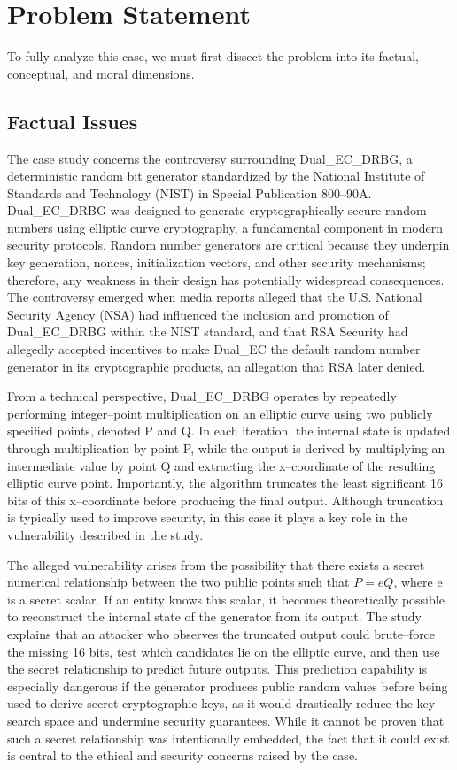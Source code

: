 \documentclass[12pt,letterpaper]{article}
\begin{document}
\section{Problem Statement}
To fully analyze this case, we must first dissect the problem into its factual, conceptual, and moral dimensions.

\subsection{Factual Issues}
The case study concerns the controversy surrounding Dual\_EC\_DRBG, a deterministic random bit generator standardized by the National Institute of Standards and Technology (NIST) in Special Publication 800--90A. Dual\_EC\_DRBG was designed to generate cryptographically secure random numbers using elliptic curve cryptography, a fundamental component in modern security protocols. Random number generators are critical because they underpin key generation, nonces, initialization vectors, and other security mechanisms; therefore, any weakness in their design has potentially widespread consequences. The controversy emerged when media reports alleged that the U.S. National Security Agency (NSA) had influenced the inclusion and promotion of Dual\_EC\_DRBG within the NIST standard, and that RSA Security had allegedly accepted incentives to make Dual\_EC the default random number generator in its cryptographic products, an allegation that RSA later denied.


From a technical perspective, Dual\_EC\_DRBG operates by repeatedly performing integer–point multiplication on an elliptic curve using two publicly specified points, denoted P and Q. In each iteration, the internal state is updated through multiplication by point P, while the output is derived by multiplying an intermediate value by point Q and extracting the x--coordinate of the resulting elliptic curve point. Importantly, the algorithm truncates the least significant 16 bits of this x--coordinate before producing the final output. Although truncation is typically used to improve security, in this case it plays a key role in the vulnerability described in the study.


The alleged vulnerability arises from the possibility that there exists a secret numerical relationship between the two public points such that $P = eQ$, where e is a secret scalar. If an entity knows this scalar, it becomes theoretically possible to reconstruct the internal state of the generator from its output. The study explains that an attacker who observes the truncated output could brute--force the missing 16 bits, test which candidates lie on the elliptic curve, and then use the secret relationship to predict future outputs. This prediction capability is especially dangerous if the generator produces public random values before being used to derive secret cryptographic keys, as it would drastically reduce the key search space and undermine security guarantees. While it cannot be proven that such a secret relationship was intentionally embedded, the fact that it could exist is central to the ethical and security concerns raised by the case.
\end{document}
